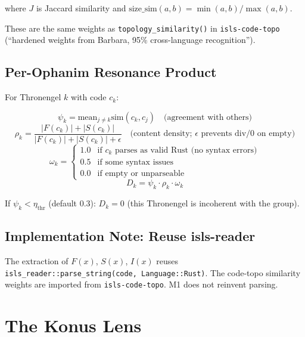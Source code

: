 \documentclass[11pt,a4paper]{article}
\begin{document}
where $J$ is Jaccard similarity and $\text{size\_sim}(a, b) = 
\min(a,b) / \max(a,b)$.

These are the same weights as \texttt{topology\_similarity()} in 
\texttt{isls-code-topo} (``hardened weights from Barbara, 95\% 
cross-language recognition'').

\subsection{Per-Ophanim Resonance Product}

For Thronengel $k$ with code $c_k$:

\begin{equation}
\psi_k = \text{mean}_{j \neq k} \text{sim}(c_k, c_j) \quad\text{(agreement with others)}
\end{equation}
\begin{equation}
\rho_k = \frac{|F(c_k)| + |S(c_k)|}{|F(c_k)| + |S(c_k)| + \epsilon} \quad\text{(content density; $\epsilon$ prevents div/0 on empty)}
\end{equation}
\begin{equation}
\omega_k = \begin{cases} 1.0 & \text{if } c_k \text{ parses as valid Rust (no syntax errors)} \\ 0.5 & \text{if some syntax issues} \\ 0.0 & \text{if empty or unparseable} \end{cases}
\end{equation}
\begin{equation}
D_k = \psi_k \cdot \rho_k \cdot \omega_k
\label{eq:dk}
\end{equation}

If $\psi_k < \eta_\text{thr}$ (default 0.3): $D_k = 0$ (this 
Thronengel is incoherent with the group).

\subsection{Implementation Note: Reuse isls-reader}

The extraction of $F(x)$, $S(x)$, $I(x)$ reuses 
\texttt{isls\_reader::parse\_string(code, Language::Rust)}. The 
code-topo similarity weights are imported from 
\texttt{isls-code-topo}. M1 does not reinvent parsing.


\section{The Konus Lens}
\label{sec:konus}
\end{document}
